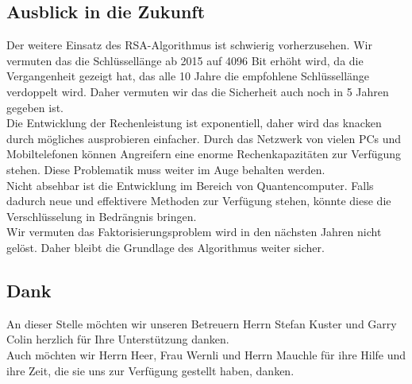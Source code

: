 \subsection{Ausblick in die Zukunft}
Der weitere Einsatz des RSA-Algorithmus ist schwierig vorherzusehen. Wir vermuten das die Schlüssellänge ab 2015 auf 4096 Bit erhöht wird, da die Vergangenheit gezeigt hat, das alle 10 Jahre die empfohlene Schlüssellänge verdoppelt wird. Daher vermuten wir das die Sicherheit auch noch in 5 Jahren gegeben ist.\\
Die Entwicklung der Rechenleistung ist exponentiell, daher wird das knacken durch mögliches ausprobieren einfacher. Durch das Netzwerk von vielen PCs und Mobiltelefonen können Angreifern eine enorme Rechenkapazitäten zur Verfügung stehen. Diese Problematik muss weiter im Auge behalten werden.\\
Nicht absehbar ist die Entwicklung im Bereich von Quantencomputer. Falls dadurch neue und effektivere Methoden zur Verfügung stehen, könnte diese die Verschlüsselung in Bedrängnis bringen. \\
Wir vermuten das Faktorisierungsproblem wird in den nächsten Jahren nicht gelöst. Daher bleibt die Grundlage des Algorithmus weiter sicher.
%
%
%
\subsection{Dank}
An dieser Stelle möchten wir unseren Betreuern Herrn Stefan Kuster und Garry Colin herzlich für Ihre Unterstützung danken.\\
Auch möchten wir Herrn Heer, Frau Wernli und Herrn Mauchle für ihre Hilfe und ihre Zeit, die sie uns zur Verfügung gestellt haben, danken.
\newpage
